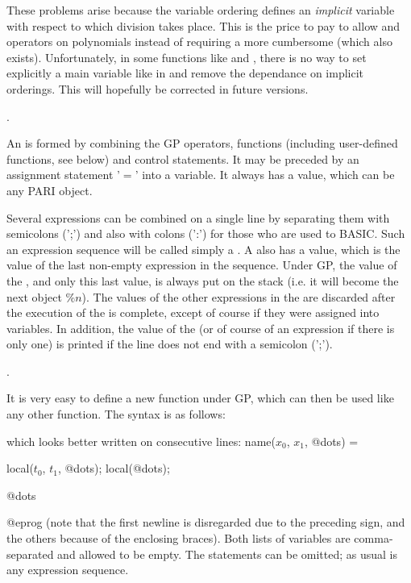 These problems arise because the variable ordering defines an \emph{implicit}
variable with respect to which division takes place. This is
the price to pay to allow \kbd{\%} and \kbd{/} operators on polynomials
instead of requiring a more cumbersome 
(which also exists). Unfortunately, in some functions like  and
, there is no way to set explicitly a main variable like in
 and remove the dependance on implicit orderings. This will
hopefully be corrected in future versions.

.

  An  is formed by combining the
GP operators, functions (including user-defined functions, see below) and
control statements. It may be preceded by an assignment statement '$=$'
into a variable. It always has a value, which can be any PARI object.

  Several expressions can be combined on a single line by separating them
with semicolons (';') and also with colons (':') for those who are used to
BASIC. Such an expression sequence will be called simply a . A
 also has a value, which is the value of the last non-empty
expression in the sequence. Under GP, the value of the , and only
this last value, is always put on the stack (i.e. it will become the next
object $\%n$). The values of the other expressions in the  are
discarded after the execution of the  is complete, except of
course if they were assigned into variables. In addition, the value of
the  (or of course of an expression if there is only one) is
printed if the line does not end with a semicolon (';').

.
\label{se:user_defined}

It is very easy to define a new function under GP, which can then be used
like any other function. The syntax is as follows:

\kbd{);} 

\noindent which looks better written on consecutive lines:
\bprogpart
name($x_0$, $x_1$, @dots) = 
{
  local($t_0$, $t_1$, @dots);
  local(@dots);

  @dots
}
@eprog
\noindent (note that the first newline is disregarded due to the preceding
\kbd{=} sign, and the others because of the enclosing braces). Both lists
of variables are comma-separated and allowed to be empty. The 
statements can be omitted; as usual  is any expression sequence.

